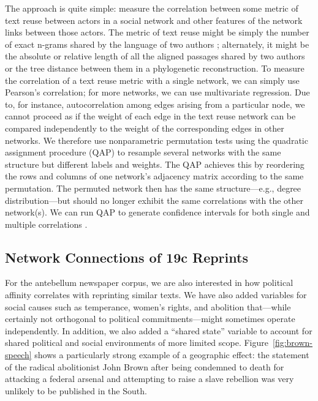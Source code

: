 \documentclass[pdftex,11pt]{article}
\begin{document}
The approach is quite simple: measure the correlation between some
metric of text reuse between actors in a social network and other
features of the network links between those actors.  The metric of
text reuse might be simply the number of exact n-grams shared by the
language of two authors \citep{margolin13:_why_simil}; alternately, it
might be the absolute or relative length of all the aligned passages
shared by two authors or the tree distance between them in a
phylogenetic reconstruction.  To measure the correlation of a text
reuse metric with a single network, we can simply use Pearson's
correlation; for more networks, we can use multivariate regression.
Due to, for instance, autocorrelation among edges arising from a
particular node, we cannot proceed as if the weight of each edge in
the text reuse network can be compared independently to the weight of
the corresponding edges in other networks.  We therefore use
nonparametric permutation tests using the quadratic assignment
procedure (QAP) to resample several networks with the same structure
but different labels and weights.  The QAP achieves this by reordering
the rows and columns of one network's adjacency matrix according to
the same permutation.  The permuted network then has the same
structure---e.g., degree distribution---but should no longer exhibit
the same correlations with the other network(s).  We can run QAP to
generate confidence intervals for both single
\citep{krackhardt87:_qap_partial_test_spurious} and multiple
correlations \citep{dekker07:_sensit_mrqap_tests_collin_autoc_condit}.

\subsection{Network Connections of 19c Reprints}
\label{sec:regress-reprint}

For the antebellum newspaper corpus, we are also interested in how
political affinity correlates with reprinting similar texts.  We have
also added variables for social causes such as temperance, women's
rights, and abolition that---while certainly not orthogonal to
political commitments---might sometimes operate independently.  In
addition, we also added a ``shared state'' variable to account for
shared political and social environments of more limited scope.
Figure~\ref{fig:brown-speech} shows a particularly strong example of a
geographic effect: the statement of the radical abolitionist John
Brown after being condemned to death for attacking a federal arsenal
and attempting to raise a slave rebellion was very unlikely to be
published in the South.
\end{document}
